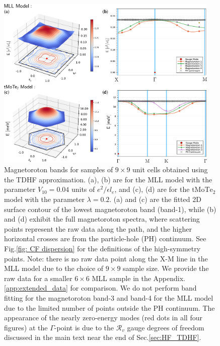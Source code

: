 \begin{figure}[htp!]
    \centering
    \includegraphics[width=0.95\textwidth]{contents/FCI_ProjWfc/figures/combined_tdhf_bands_and_surface_contour.pdf}
    \caption{Magnetoroton bands for samples of $9\times9$ unit cells obtained using the TDHF approximation. (a), (b) are for the MLL model with the parameter $V_{10}=0.04$ units of $e^2/\epsilon l_e$, and (c), (d) are for the $\mathrm{tMoTe_2}$ model with the parameter $\lambda=0.2$. (a) and (c) are the fitted 2D surface contour of the lowest magnetoroton band (band-1), while (b) and (d) exhibit the full magnetoroton spectra, where scattering points represent the raw data along the path, and the higher horizontal crosses are from the particle-hole (PH) continuum. See Fig.\ref{fig: CF dispersion} for the definitions of the high-symmetry points. Note: there is no raw data point along the $\mathrm{X}$-$\mathrm{M}$ line in the MLL model due to the choice of $9\times9$ sample size. We provide the raw data for a smaller $6\times6$ MLL sample in the Appendix. \ref{app:extended_data} for comparison. We do not perform band fitting for the magnetoroton band-3 and band-4 for the MLL model due to the limited number of points outside the PH continuum. The appearance of the nearly zero-energy modes (red dots in all four figures) at the $\Gamma$-point is due to the $\mathcal R_v$ gauge degrees of freedom discussed in the main text near the end of Sec.\ref{sec:HF_TDHF}.}
    \label{fig: magnetoroton spectrum}
\end{figure}  

